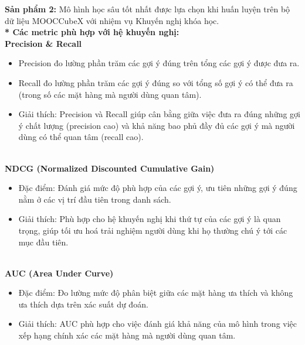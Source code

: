 \textbf{Sản phẩm 2:} Mô hình học sâu tốt nhất được lựa chọn khi huấn luyện trên bộ dữ liệu MOOCCubeX với nhiệm vụ Khuyến nghị khóa học.\\
\textbf{* Các metric phù hợp với hệ khuyến nghị:}\\
\textbf{Precision \& Recall}
\begin{itemize}
    \item Precision đo lường phần trăm các gợi ý đúng trên tổng các gợi ý được đưa ra.
    \item Recall đo lường phần trăm các gợi ý đúng so với tổng số gợi ý có thể đưa ra (trong số các mặt hàng mà người dùng quan tâm).
    \item Giải thích: Precision và Recall giúp cân bằng giữa việc đưa ra đúng những gợi ý chất lượng (precision cao) và khả năng bao phủ đầy đủ các gợi ý mà người dùng có thể quan tâm (recall cao).
\end{itemize}\\
\textbf{NDCG (Normalized Discounted Cumulative Gain)}
\begin{itemize}
    \item Đặc điểm: Đánh giá mức độ phù hợp của các gợi ý, ưu tiên những gợi ý đúng nằm ở các vị trí đầu tiên trong danh sách.
    \item Giải thích: Phù hợp cho hệ khuyến nghị khi thứ tự của các gợi ý là quan trọng, giúp tối ưu hoá trải nghiệm người dùng khi họ thường chú ý tới các mục đầu tiên.
\end{itemize}\\
\textbf{AUC (Area Under Curve)}
\begin{itemize}
    \item Đặc điểm: Đo lường mức độ phân biệt giữa các mặt hàng ưa thích và không ưa thích dựa trên xác suất dự đoán.
    \item Giải thích: AUC phù hợp cho việc đánh giá khả năng của mô hình trong việc xếp hạng chính xác các mặt hàng mà người dùng quan tâm.
\end{itemize}
